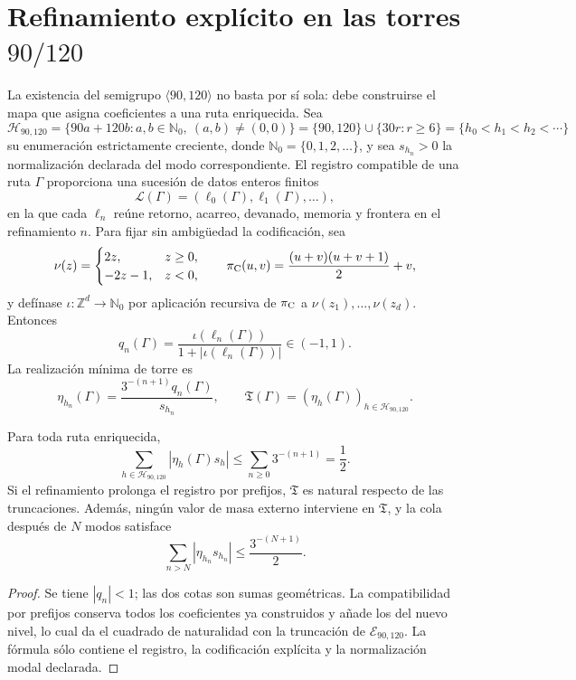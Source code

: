 \section{Refinamiento explícito en las torres \texorpdfstring{\(90/120\)}{90/120}}

La existencia del semigrupo \(\langle90,120\rangle\) no basta por sí sola:
debe construirse el mapa que asigna coeficientes a una ruta enriquecida. Sea
\[
 \mathcal H_{90,120}
 =\{90a+120b:a,b\in\mathbb N_0,\ (a,b)\ne(0,0)\}
 =\{90,120\}\cup\{30r:r\geq6\}
 =\{h_0<h_1<h_2<\cdots\}
\]
su enumeración estrictamente creciente, donde \(\mathbb N_0=\{0,1,2,\ldots\}\),
y sea \(s_{h_n}>0\) la normalización declarada del modo correspondiente. El
registro compatible de una ruta
\(\Gamma\) proporciona una sucesión de datos enteros finitos
\[
 \mathcal L(\Gamma)=(\ell_0(\Gamma),\ell_1(\Gamma),\ldots),
\]
en la que cada \(\ell_n\) reúne retorno, acarreo, devanado, memoria y frontera
en el refinamiento \(n\). Para fijar sin ambigüedad la codificación, sea
\[
 \nu(z)=
 \begin{cases}2z,&z\geq0,\\-2z-1,&z<0,\end{cases}
 \qquad
 \pi_{\rm C}(u,v)=\frac{(u+v)(u+v+1)}2+v,
\]
y defínase \(\iota:\mathbb Z^d\to\mathbb N_0\) por aplicación recursiva de
\(\pi_{\rm C}\) a \(\nu(z_1),\ldots,\nu(z_d)\). Entonces
\[
 q_n(\Gamma)
 =\frac{\iota(\ell_n(\Gamma))}
 {1+|\iota(\ell_n(\Gamma))|}\in(-1,1).
\]
La realización mínima de torre es
\[
 \eta_{h_n}(\Gamma)
 =\frac{3^{-(n+1)}q_n(\Gamma)}{s_{h_n}},
 \qquad
 \mathfrak T(\Gamma)
 =(\eta_h(\Gamma))_{h\in\mathcal H_{90,120}}.
\]

\begin{theorem}
Para toda ruta enriquecida,
\[
 \sum_{h\in\mathcal H_{90,120}}|\eta_h(\Gamma)s_h|
 \leq\sum_{n\ge0}3^{-(n+1)}=\frac12.
\]
Si el refinamiento prolonga el registro por prefijos, \(\mathfrak T\) es natural
respecto de las truncaciones. Además, ningún valor de masa externo interviene
en \(\mathfrak T\), y la cola después de \(N\) modos satisface
\[
 \sum_{n>N}|\eta_{h_n}s_{h_n}|
 \leq\frac{3^{-(N+1)}}2.
\]
\end{theorem}

\begin{proof}
Se tiene \(|q_n|<1\); las dos cotas son sumas geométricas. La compatibilidad
por prefijos conserva todos los coeficientes ya construidos y añade los del
nuevo nivel, lo cual da el cuadrado de naturalidad con la truncación de
\(\mathcal E_{90,120}\). La fórmula sólo contiene el registro, la codificación
explícita y la normalización modal declarada.
\end{proof}

